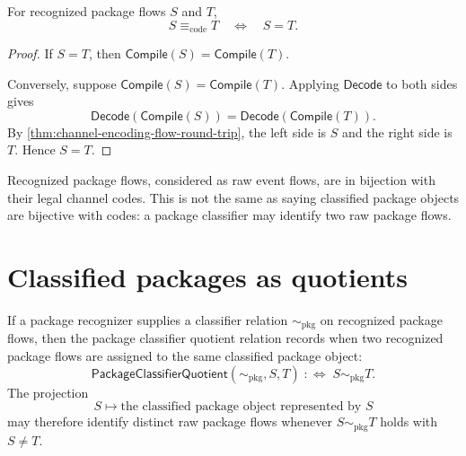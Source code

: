 \begin{proposition}
\label{prop:package-generated-code-equivalence-is-equality}
For recognized package flows $S$ and $T$,
$$
  S \equiv_{\mathrm{code}} T
  \quad\Longleftrightarrow\quad
  S=T.
$$
\end{proposition}

\begin{proof}
If $S=T$, then $\mathsf{Compile}(S)=\mathsf{Compile}(T)$.

Conversely, suppose $\mathsf{Compile}(S)=\mathsf{Compile}(T)$. Applying $\mathsf{Decode}$ to both sides gives
$$
  \mathsf{Decode}(\mathsf{Compile}(S))
  =
  \mathsf{Decode}(\mathsf{Compile}(T)).
$$
By \autoref{thm:channel-encoding-flow-round-trip}, the left side is $S$ and the right side is $T$. Hence $S=T$.
\end{proof}

\begin{corollary}
\label{cor:package-generated-raw-flows-code-bijective}
Recognized package flows, considered as raw event flows, are in bijection with their legal channel codes. This is not the same as saying classified package objects are bijective with codes: a package classifier may identify two raw package flows.
\end{corollary}

\section{Classified packages as quotients}
\label{sec:package-generated-classified-quotients}

\begin{definition}
\label{def:package-generated-classifier-quotient}
If a package recognizer supplies a classifier relation $\sim_{\mathrm{pkg}}$ on recognized package flows, then the package classifier quotient relation records when two recognized package flows are assigned to the same classified package object:
$$
  \mathsf{PackageClassifierQuotient}(\sim_{\mathrm{pkg}},S,T)
  \;:\Longleftrightarrow\;
  S \sim_{\mathrm{pkg}} T.
$$
The projection
$$
  S \longmapsto \text{the classified package object represented by } S
$$
may therefore identify distinct raw package flows whenever $S\sim_{\mathrm{pkg}}T$ holds with $S\neq T$.
\end{definition}

